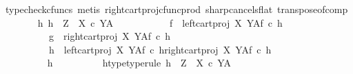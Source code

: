 \begin{isabellebody}
\ {\isacharparenleft}{\kern0pt}typecheck{\isacharunderscore}{\kern0pt}cfuncs{\isacharcomma}{\kern0pt}\ metis\ right{\isacharunderscore}{\kern0pt}cart{\isacharunderscore}{\kern0pt}proj{\isacharunderscore}{\kern0pt}cfunc{\isacharunderscore}{\kern0pt}prod\ sharp{\isacharunderscore}{\kern0pt}cancels{\isacharunderscore}{\kern0pt}flat\ transpose{\isacharunderscore}{\kern0pt}of{\isacharunderscore}{\kern0pt}comp{\isacharparenright}{\kern0pt}\isanewline
\ \ \ \ \ \ \isamarkupfalse%
\ {\isachardoublequoteopen}{\isasymAnd}h{}{\isachardot}{\kern0pt}\ h{}\ {\isacharcolon}{\kern0pt}\ Z\ {\isasymrightarrow}\ {\isacharparenleft}{\kern0pt}X\ {\isasymtimes}\isactrlsub c\ Y{\isacharparenright}{\kern0pt}\isactrlbsup A\isactrlesup \ {\isasymLongrightarrow}\isanewline
\ \ \ \ \ \ \ \ \ \ f\ {\isacharequal}{\kern0pt}\ left{\isacharunderscore}{\kern0pt}cart{\isacharunderscore}{\kern0pt}proj\ X\ Y\isactrlbsup A\isactrlesup \isactrlsub f\ {\isasymcirc}\isactrlsub c\ h{}\ {\isasymLongrightarrow}\isanewline
\ \ \ \ \ \ \ \ \ \ g\ {\isacharequal}{\kern0pt}\ right{\isacharunderscore}{\kern0pt}cart{\isacharunderscore}{\kern0pt}proj\ X\ Y\isactrlbsup A\isactrlesup \isactrlsub f\ {\isasymcirc}\isactrlsub c\ h{}\ {\isasymLongrightarrow}\isanewline
\ \ \ \ \ \ \ \ \ \ h{}\ {\isacharequal}{\kern0pt}\ {\isasymlangle}{\isacharparenleft}{\kern0pt}left{\isacharunderscore}{\kern0pt}cart{\isacharunderscore}{\kern0pt}proj\ X\ Y\isactrlbsup A\isactrlesup \isactrlsub f\ {\isasymcirc}\isactrlsub c\ h{}{\isacharparenright}{\kern0pt}\isactrlsup {\isasymflat}{\isacharcomma}{\kern0pt}{\isacharparenleft}{\kern0pt}right{\isacharunderscore}{\kern0pt}cart{\isacharunderscore}{\kern0pt}proj\ X\ Y\isactrlbsup A\isactrlesup \isactrlsub f\ {\isasymcirc}\isactrlsub c\ h{}{\isacharparenright}{\kern0pt}\isactrlsup {\isasymflat}{\isasymrangle}\isactrlsup {\isasymsharp}{\isachardoublequoteclose}\isanewline
\ \ \ \ \ \ \isamarkupfalse%
\ {\isacharminus}{\kern0pt}\isanewline
\ \ \ \ \ \ \ \ \isamarkupfalse%
\ h\isanewline
\ \ \ \ \ \ \ \ \isamarkupfalse%
\ h{\isacharunderscore}{\kern0pt}type{\isacharbrackleft}{\kern0pt}type{\isacharunderscore}{\kern0pt}rule{\isacharbrackright}{\kern0pt}{\isacharcolon}{\kern0pt}\ {\isachardoublequoteopen}h\ {\isacharcolon}{\kern0pt}\ Z\ {\isasymrightarrow}\ {\isacharparenleft}{\kern0pt}X\ {\isasymtimes}\isactrlsub c\ Y{\isacharparenright}{\kern0pt}\isactrlbsup A\isactrlesup {\isachardoublequoteclose}\isanewline
\ \ \ \ \ \ \ \ \isamarkupfalse%

\end{isabellebody}
